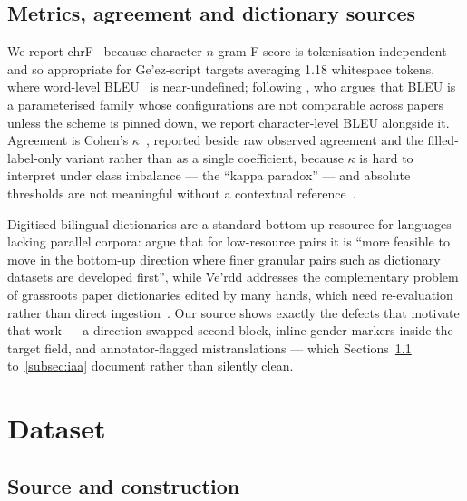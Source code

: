 \documentclass[11pt]{article}
\begin{document}
\subsection{Metrics, agreement and dictionary sources}

We report chrF~\citep{popovic-2015-chrf} because character $n$-gram F-score
is tokenisation-independent and so appropriate for Ge'ez-script targets
averaging 1.18 whitespace tokens, where word-level
BLEU~\citep{papineni-etal-2002-bleu} is near-undefined; following
\citet{post-2018-call}, who argues that BLEU is a parameterised family whose
configurations are not comparable across papers unless the scheme is pinned
down, we report character-level BLEU alongside it. Agreement is Cohen's
$\kappa$~\citep{cohen-1960-coefficient}, reported beside raw observed
agreement and the filled-label-only variant rather than as a single
coefficient, because $\kappa$ is hard to interpret under class imbalance ---
the ``kappa paradox'' --- and absolute thresholds are not meaningful without
a contextual reference~\citep{wong-etal-2021-cross}.

Digitised bilingual dictionaries are a standard bottom-up resource for
languages lacking parallel corpora:
\citet{wickramasinghe-desilva-2023-sinhala} argue that for low-resource
pairs it is ``more feasible to move in the bottom-up direction where finer
granular pairs such as dictionary datasets are developed first'', while
Ve'rdd addresses the complementary problem of grassroots paper dictionaries
edited by many hands, which need re-evaluation rather than direct
ingestion~\citep{alnajjar-etal-2020-verdd}. Our source shows exactly the
defects that motivate that work --- a direction-swapped second block, inline
gender markers inside the target field, and annotator-flagged
mistranslations --- which Sections~\ref{subsec:source} to~\ref{subsec:iaa}
document rather than silently clean.

\section{Dataset}
\label{sec:dataset}

\subsection{Source and construction}
\label{subsec:source}
\end{document}
